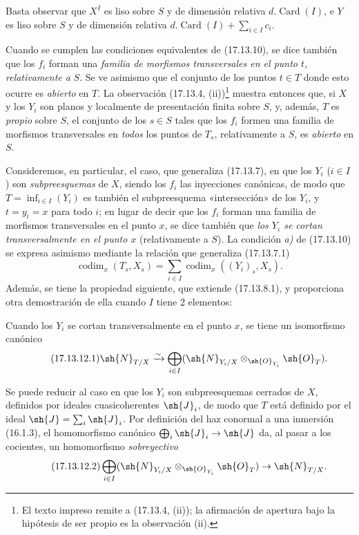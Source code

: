 Basta observar que $X^I$ es liso sobre $S$ y de dimensión relativa $d.\operatorname{Card}(I)$, e $Y$ es liso sobre $S$ y de dimensión relativa $d.\operatorname{Card}(I)+\sum_{i\in I}c_i$.

Cuando se cumplen las condiciones equivalentes de (17.13.10), se dice también que los $f_i$ forman una \emph{familia de morfismos transversales en el punto $t$, relativamente a} $S$. Se ve asimismo que el conjunto de los puntos $t\in T$ donde esto ocurre es \emph{abierto} en $T$. La observación (17.13.4, (ii))\footnote{El texto impreso remite a (17.13.4, (ii)); la afirmación de apertura bajo la hipótesis de ser propio es la observación (ii).} muestra entonces que, si $X$ y los $Y_i$ son planos y localmente de presentación finita sobre $S$, y, además, $T$ es \emph{propio} sobre $S$, el conjunto de los $s\in S$ tales que los $f_i$ formen una familia de morfismos transversales en \emph{todos} los puntos de $T_s$, relativamente a $S$, es \emph{abierto} en $S$.

\begin{env}[17.13.11]
\label{IV.17.13.11}
Consideremos, en particular, el caso, que generaliza (17.13.7), en que los $Y_i$ ($i\in I$) son \emph{subpreesquemas} de $X$, siendo los $f_i$ las inyecciones canónicas, de modo que $T=\inf_{i\in I}(Y_i)$ es también el subpreesquema «intersección» de los $Y_i$, y $t=y_i=x$ para todo $i$; en lugar de decir que los $f_i$ forman una familia de morfismos transversales en el punto $x$, se dice también que \emph{los $Y_i$ se cortan transversalmente en el punto $x$} (relativamente a $S$). La condición \emph{a)} de (17.13.10) se expresa asimismo mediante la relación que generaliza (17.13.7.1)
\[
\label{IV.17.13.11.1}
\tag{17.13.11.1}
\operatorname{codim}_x(T_s,X_s)=\sum_{i\in I}\operatorname{codim}_x((Y_i)_s,X_s).
\]
Además, se tiene la propiedad siguiente, que extiende (17.13.8.1), y proporciona otra demostración de ella cuando $I$ tiene 2 elementos:
\end{env}

\begin{corollary}[17.13.12]
\label{IV.17.13.12}
Cuando los $Y_i$ se cortan transversalmente en el punto $x$, se tiene un isomorfismo canónico
\[
\label{IV.17.13.12.1}
\tag{17.13.12.1}
\sh{N}_{T/X}\xrightarrow{\sim}\bigoplus_{i\in I}(\sh{N}_{Y_i/X}\otimes_{\sh{O}_{Y_i}}\sh{O}_T).
\]
\end{corollary}

Se puede reducir al caso en que los $Y_i$ son subpreesquemas cerrados de $X$, definidos por ideales cuasicoherentes $\sh{J}_i$, de modo que $T$ está definido por el ideal $\sh{J}=\sum_i\sh{J}_i$. Por definición del haz conormal a una inmersión (16.1.3), el homomorfismo canónico $\bigoplus_i\sh{J}_i\to\sh{J}$ da, al pasar a los cocientes, un homomorfismo \emph{sobreyectivo}
\[
\label{IV.17.13.12.2}
\tag{17.13.12.2}
\bigoplus_{i\in I}(\sh{N}_{Y_i/X}\otimes_{\sh{O}_{Y_i}}\sh{O}_T)\to\sh{N}_{T/X}.
\]

